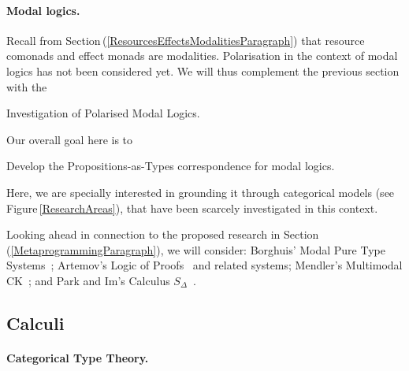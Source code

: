 \documentclass[11pt,twocolumn]{article}
\newcounter{CC}
\newenvironment{resenumerate}
  {\begin{list}{[\textbf{\arabic{CC}]}}
  {\usecounter{CC}
   \setlength{\topsep}{2pt}
   \setlength{\partopsep}{2pt}
   \setlength{\itemsep}{2.5pt}
   \setlength{\parsep}{2.5pt}
   \setlength{\leftmargin}{1.65em}
   \setlength{\labelwidth}{1.15em}
 }}
  {\end{list}}
\newcommand{\hide}[1]{}
\newcommand{\hidenote}{\hide}
\newcommand{\pref}[1]{\,(\ref{#1})}
\newcommand{\eg}{\emph{eg.}}
\begin{document}
\hidenote{polarised dialectica for program extraction motivated by
  polarised dialectica category construction}

\hidenote{Investigate relationship to Chuck Liang \& Dale Miller's work}

\hidenote{Investigate relationship to Oleg Kiselyov and Chung-chieh Shan's
  substructural type system for delimited control}

\paragraph{Modal logics.}
\label{ModalLogicsParagraph}

Recall from Section\pref{ResourcesEffectsModalitiesParagraph} that resource
comonads and effect monads are modalities.  Polarisation in the context of
modal logics has not been considered yet.  We will thus complement the
previous section with the 
\begin{resenumerate}\setcounter{CC}{0}
\item
  Investigation of Polarised Modal Logics.
\end{resenumerate}

Our overall goal here is to
\begin{resenumerate}\setcounter{CC}{1}
\item
  Develop the Propositions-as-Types correspondence for modal logics.
\end{resenumerate}
Here, we are specially interested in grounding it through categorical models
(see Figure\,\ref{ResearchAreas}), that have been scarcely investigated in
this context.

Looking ahead in connection to the proposed research in
Section\pref{MetaprogrammingParagraph}, we will 
consider: %
%
Borghuis' Modal Pure Type Systems~\cite{ModalPTS};
%
Artemov's Logic of Proofs~\cite{ArtemovLP} and related systems;
%
Mendler's Multimodal CK~\cite{MendlerMMCK};
and
%
Park and Im's Calculus $S_\Delta$~\cite{ParkIm}.

\subsection{Calculi}
\label{CalculiSubsection}

\hidenote{\ldots}

\setcounter{paragraph}{0}
\paragraph*{Categorical Type Theory.}
\end{document}
